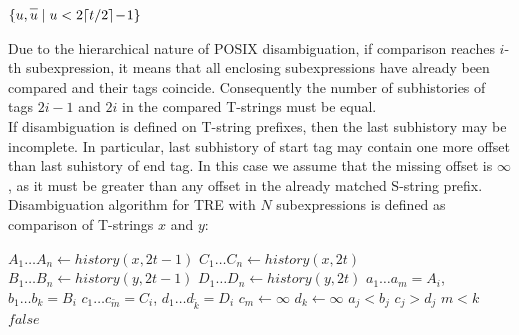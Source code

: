 \documentclass{article}
\newcommand{\Xset}{\!\leftarrow\!}
\newcommand{\Xeq}{\!=\!}
\newcommand*{\Xbar}[1]{\overline{#1\vphantom{\bar{#1}}}}
\theoremstyle{definition}
\begin{document}
\begin{multicols}{2}
    \begin{algorithm}[H] \DontPrintSemicolon {} 
     {
        \Return $\{ u, \Xbar{u} \mid u < 2 \lceil t / 2 \rceil \!-\! 1 \}$ \;
    }
    \end{algorithm}

Due to the hierarchical nature of POSIX disambiguation, if comparison reaches $i$-th subexpression,
it means that all enclosing subexpressions have already been compared and their tags coincide.
Consequently the number of subhistories of tags $2i - 1$ and $2i$ in the compared T-strings must be equal.
\\

If disambiguation is defined on T-string prefixes, then the last subhistory may be incomplete.
In particular, last subhistory of start tag may contain one more offset than last suhistory of end tag.
In this case we assume that the missing offset is $\infty$, as it must be greater than any offset in the already matched S-string prefix.
\\

Disambiguation algorithm for TRE with $N$ subexpressions is defined as comparison of T-strings $x$ and $y$:

    \begin{algorithm}[H] \DontPrintSemicolon {}   
     {
        \For {$t \Xeq \overline{1, N}$} {
            $A_1 \dots A_n \Xset history(x, 2t \!-\! 1)$ \;
            $C_1 \dots C_n \Xset history(x, 2t)$ \;
            $B_1 \dots B_n \Xset history(y, 2t \!-\! 1)$ \;
            $D_1 \dots D_n \Xset history(y, 2t)$ \;
            \For {$i \Xeq \overline{1, n}$} {
                \Let $a_1 \dots a_m \Xeq A_i$, $b_1 \dots b_k \Xeq B_i$ \;
                \Let $c_1 \dots c_{\widetilde{m}} \Xeq C_i$, $d_1 \dots d_{\widetilde{k}} \Xeq D_i$ \;
                 {$c_m \Xset \infty$}
                 {$d_k \Xset \infty$}
                \For {$j \Xeq \overline{1, min(m, k)}$} {
                     {\Return $a_j \!<\! b_j$}
                     {\Return $c_j \!>\! d_j$}
                }
                 {\Return $m \!<\! k$}
            }
        }
        \Return $false$ \;
    }
    \end{algorithm}





\end{multicols}
\end{document}
